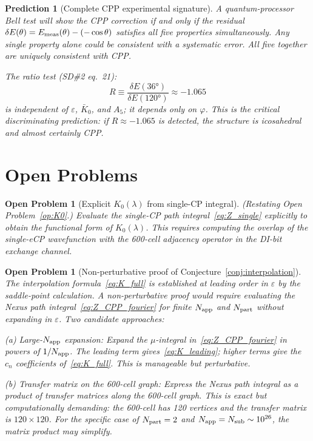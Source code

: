 \documentclass[11pt,a4paper]{article}
\newtheorem{openprob}[theorem]{Open Problem}
\newtheorem{prediction}[theorem]{Prediction}
\newcommand{\phig}{\varphi}
\newcommand{\eps}{\varepsilon}
\newcommand{\Napp}{N_{\rm app}}
\newcommand{\Npart}{N_{\rm part}}
\newcommand{\Nsub}{N_{\rm sub}}
\begin{document}
\begin{prediction}[Complete CPP experimental signature]
\label{pred:complete}
A quantum-processor Bell test will show the CPP correction if and
only if the residual $\delta E(\theta) = E_{\rm meas}(\theta) -
(-\cos\theta)$ satisfies all five properties simultaneously.
Any single property alone could be consistent with a systematic
error.  All five together are uniquely consistent with CPP.

The ratio test (SD\#2 eq.~21):
\begin{equation}
R \equiv \frac{\delta E(36°)}{\delta E(120°)}
\approx -1.065
\label{eq:ratio_pred}
\end{equation}
is independent of $\eps$, $\bar K_0$, and $A_5$; it depends only
on $\phig$.  This is the critical discriminating prediction:
if $R \approx -1.065$ is detected, the structure is icosahedral
and almost certainly CPP.
\end{prediction}

\section{Open Problems}

\begin{openprob}[Explicit $K_0(\lambda)$ from single-CP integral]
(Restating Open Problem~\ref{op:K0}.)
Evaluate the single-CP path integral~\eqref{eq:Z_single}
explicitly to obtain the functional form of $K_0(\lambda)$.
This requires computing the overlap of the single-eCP wavefunction
with the 600-cell adjacency operator in the DI-bit exchange channel.
\end{openprob}

\begin{openprob}[Non-perturbative proof of Conjecture~\ref{conj:interpolation}]
\label{op:nonpert}
The interpolation formula~\eqref{eq:K_full} is established at
leading order in $\eps$ by the saddle-point calculation.  A
non-perturbative proof would require evaluating the Nexus path
integral~\eqref{eq:Z_CPP_fourier} for finite $\Napp$ and $\Npart$
without expanding in $\eps$.  Two candidate approaches:

\textit{(a) Large-$\Napp$ expansion:}  Expand the $\mu$-integral
in~\eqref{eq:Z_CPP_fourier} in powers of $1/\Napp$.  The leading
term gives~\eqref{eq:K_leading}; higher terms give the $c_n$
coefficients of~\eqref{eq:K_full}.  This is manageable but
perturbative.

\textit{(b) Transfer matrix on the 600-cell graph:}  Express the
Nexus path integral as a product of transfer matrices along the
600-cell graph.  This is exact but computationally demanding:
the 600-cell has 120 vertices and the transfer matrix is
$120\times120$.  For the specific case of $\Npart = 2$ and
$\Napp = \Nsub \sim 10^{26}$, the matrix product may simplify.
\end{openprob}
\end{document}
